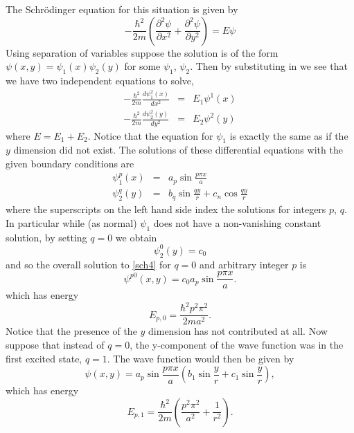\documentclass[a4paper,12pt]{article}
\numberwithin{equation}{section}
\begin{document}
The Schr\"{o}dinger equation for this situation is given by
\begin{equation}\label{sch4}
-\frac{\hbar^2}{2m}\left(\frac{\partial^2 \psi}{\partial x^2} + \frac{\partial^2  \psi}{\partial y^2}\right) = E\psi
\end{equation}
Using separation of variables suppose the solution is of the form $\psi(x,y)=\psi_1(x)\psi_2(y)$ for some $\psi_1$, $\psi_2$. Then by substituting in we see that we have two independent equations to solve,
\begin{eqnarray}
-\frac{\hbar^2}{2m}\frac{d\psi_1^2(x)}{dx^2} &=& E_1\psi^1(x)\\
-\frac{\hbar^2}{2m}\frac{d\psi_2^2(y)}{dy^2} &=& E_2\psi^2(y)
\end{eqnarray} 
where $E = E_1+E_2$. Notice that the equation for $\psi_1$ is exactly the same as if the $y$ dimension did not exist. The solutions of these differential equations with the given boundary conditions are
\begin{eqnarray}
\psi_1^p(x) &=& a_p\sin\frac{p\pi x}{a}\\
\psi_2^q(y) &=& b_q\sin\frac{qy}{r} + c_n\cos\frac{qy}{r}
\end{eqnarray}
where the superscripts on the left hand side index the solutions for integers $p$, $q$. In particular while (as normal) $\psi_1$ does not have a non-vanishing constant solution, by setting $q=0$ we obtain 
\begin{equation}
\psi_2^0(y) = c_0
\end{equation}
and so the overall solution to \ref{sch4} for $q=0$ and arbitrary integer $p$ is
\begin{equation}
\psi^{p0}(x,y) = c_0a_p\sin\frac{p\pi x}{a}.
\end{equation} 
which has energy 
\begin{equation}
E_{p,0} = \frac{\hbar^2p^2\pi^2}{2ma^2}.
\end{equation}
Notice that the presence of the $y$ dimension has not contributed at all. Now suppose that instead of $q=0$, the y-component of the wave function was in the first excited state, $q=1$.
The wave function would then be given by
\begin{equation}
\psi(x,y) = a_p\sin\frac{p\pi x}{a}\left(b_1\sin\frac{y}{r} + c_1\sin\frac{y}{r}\right),
\end{equation}
which has energy
\begin{equation}
E_{p,1} = \frac{\hbar^2}{2m}\left(\frac{p^2\pi^2}{a^2} + \frac{1}{r^2}\right).
\end{equation}
\end{document}
